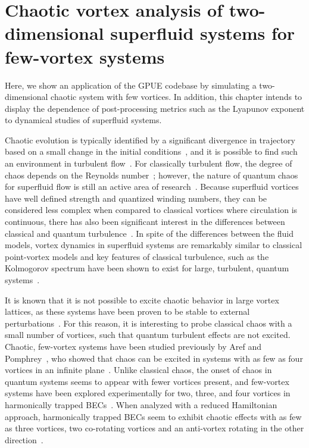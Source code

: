 \chapter{Chaotic vortex analysis of two-dimensional superfluid systems for few-vortex systems}
\label{ch:2d}

Here, we show an application of the GPUE codebase by simulating a two-dimensional chaotic system with few vortices.
In addition, this chapter intends to display the dependence of post-processing metrics such as the Lyapunov exponent to dynamical studies of superfluid systems.

Chaotic evolution is typically identified by a significant divergence in trajectory based on a small change in the initial conditions~\cite{strogatz2018}, and it is possible to find such an environment in turbulent flow~\cite{spiegel1987, biferale2005}.
For classically turbulent flow, the degree of chaos depends on the Reynolds number~\cite{berera2018}; however, the nature of quantum chaos for superfluid flow is still an active area of research~\cite{white2014}.
Because superfluid vortices have well defined strength and quantized winding numbers, they can be considered less complex when compared to classical vortices where circulation is continuous, there has also been significant interest in the differences between classical and quantum turbulence~\cite{nemirovskii1995,kyriakopoulos2014,koukouloyannis2014,navarro2013}.
In spite of the differences between the fluid models, vortex dynamics in superfluid systems are remarkably similar to classical point-vortex models and key features of classical turbulence, such as the Kolmogorov spectrum have been shown to exist for large, turbulent, quantum systems~\cite{nore1997,stalp1999,araki2002,salort2010}.

It is known that it is not possible to excite chaotic behavior in large vortex lattices, as these systems have been proven to be stable to external perturbations~\cite{o2017}.
For this reason, it is interesting to probe classical chaos with a small number of vortices, such that quantum turbulent effects are not excited.
Chaotic, few-vortex systems have been studied previously by Aref and Pomphrey~\cite{aref1982, aref1980, aref1983}, who showed that chaos can be excited in systems with as few as four vortices in an infinite plane~\cite{aref1982}.
Unlike classical chaos, the onset of chaos in quantum systems seems to appear with fewer vortices present, and few-vortex systems have been explored experimentally for two, three, and four vortices in harmonically trapped BECs~\cite{navarro2013}.
When analyzed with a reduced Hamiltonian approach, harmonically trapped BECs seem to exhibit chaotic effects with as few as three vortices, two co-rotating vortices and an anti-vortex rotating in the other direction~\cite{kyriakopoulos2014,koukouloyannis2014}.

